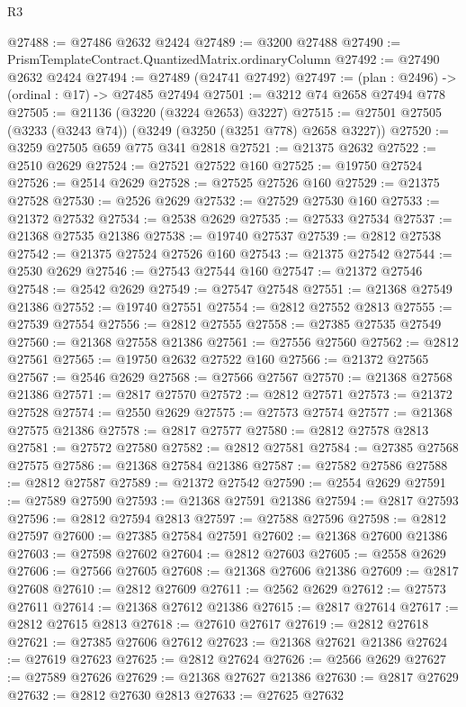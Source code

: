 \begin{lexlean}{R3}
\begin{coremodule}
@27488 := @27486 @2632 @2424
@27489 := @3200 @27488
@27490 := PrismTemplateContract.QuantizedMatrix.ordinaryColumn
@27492 := @27490 @2632 @2424
@27494 := @27489 (@24741 @27492)
@27497 := (plan : @2496) -> (ordinal : @17) -> @27485 @27494
@27501 := @3212 @74 @2658 @27494 @778
@27505 := @21136 (@3220 (@3224 @2653) @3227)
@27515 := @27501 @27505 (@3233 (@3243 @74)) (@3249 (@3250 (@3251 @778) @2658 @3227))
@27520 := @3259 @27505 @659 @775 @341 @2818
@27521 := @21375 @2632
@27522 := @2510 @2629
@27524 := @27521 @27522 @160
@27525 := @19750 @27524
@27526 := @2514 @2629
@27528 := @27525 @27526 @160
@27529 := @21375 @27528
@27530 := @2526 @2629
@27532 := @27529 @27530 @160
@27533 := @21372 @27532
@27534 := @2538 @2629
@27535 := @27533 @27534
@27537 := @21368 @27535 @21386
@27538 := @19740 @27537
@27539 := @2812 @27538
@27542 := @21375 @27524 @27526 @160
@27543 := @21375 @27542
@27544 := @2530 @2629
@27546 := @27543 @27544 @160
@27547 := @21372 @27546
@27548 := @2542 @2629
@27549 := @27547 @27548
@27551 := @21368 @27549 @21386
@27552 := @19740 @27551
@27554 := @2812 @27552 @2813
@27555 := @27539 @27554
@27556 := @2812 @27555
@27558 := @27385 @27535 @27549
@27560 := @21368 @27558 @21386
@27561 := @27556 @27560
@27562 := @2812 @27561
@27565 := @19750 @2632 @27522 @160
@27566 := @21372 @27565
@27567 := @2546 @2629
@27568 := @27566 @27567
@27570 := @21368 @27568 @21386
@27571 := @2817 @27570
@27572 := @2812 @27571
@27573 := @21372 @27528
@27574 := @2550 @2629
@27575 := @27573 @27574
@27577 := @21368 @27575 @21386
@27578 := @2817 @27577
@27580 := @2812 @27578 @2813
@27581 := @27572 @27580
@27582 := @2812 @27581
@27584 := @27385 @27568 @27575
@27586 := @21368 @27584 @21386
@27587 := @27582 @27586
@27588 := @2812 @27587
@27589 := @21372 @27542
@27590 := @2554 @2629
@27591 := @27589 @27590
@27593 := @21368 @27591 @21386
@27594 := @2817 @27593
@27596 := @2812 @27594 @2813
@27597 := @27588 @27596
@27598 := @2812 @27597
@27600 := @27385 @27584 @27591
@27602 := @21368 @27600 @21386
@27603 := @27598 @27602
@27604 := @2812 @27603
@27605 := @2558 @2629
@27606 := @27566 @27605
@27608 := @21368 @27606 @21386
@27609 := @2817 @27608
@27610 := @2812 @27609
@27611 := @2562 @2629
@27612 := @27573 @27611
@27614 := @21368 @27612 @21386
@27615 := @2817 @27614
@27617 := @2812 @27615 @2813
@27618 := @27610 @27617
@27619 := @2812 @27618
@27621 := @27385 @27606 @27612
@27623 := @21368 @27621 @21386
@27624 := @27619 @27623
@27625 := @2812 @27624
@27626 := @2566 @2629
@27627 := @27589 @27626
@27629 := @21368 @27627 @21386
@27630 := @2817 @27629
@27632 := @2812 @27630 @2813
@27633 := @27625 @27632

\end{coremodule}
\end{lexlean}
